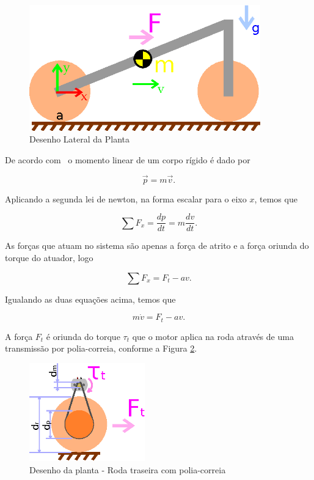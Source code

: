         \begin{figure}[h]
            \centering
            \includegraphics[width=10cm]{Imagens/velocidade.eps}
            \caption{Desenho Lateral da Planta}
            \label{img:velocidade}
        \end{figure}
        
        De acordo com~\cite{book:goldstein} o momento linear de um corpo rígido é dado por
        
        \begin{equation}
            \vec p = m\vec v.
        \end{equation}
        
        Aplicando a segunda lei de newton, na forma escalar para o eixo $x$, temos que
        
        \begin{equation}
            \sum F_x  = \frac{dp}{dt} = m\frac{dv}{dt}.
        \end{equation}
        
        As forças que atuam no sistema são apenas a força de atrito e a força oriunda do torque do atuador, logo
        
        \begin{equation}
            \sum F_x = F_t - av.
        \end{equation}
        
        Igualando as duas equações acima, temos que
        
        \begin{equation}
            m\dot v = F_t - av.
        \end{equation}
        
        A força $F_t$ é oriunda do torque $\tau _t$ que o motor aplica na roda através de uma transmissão por polia-correia, conforme a Figura \ref{img:polia}.
        
        \begin{figure}[h]
            \centering
            \includegraphics[width=5cm]{Imagens/polia.eps}
            \caption{Desenho da planta - Roda traseira com polia-correia}
            \label{img:polia}
        \end{figure}

